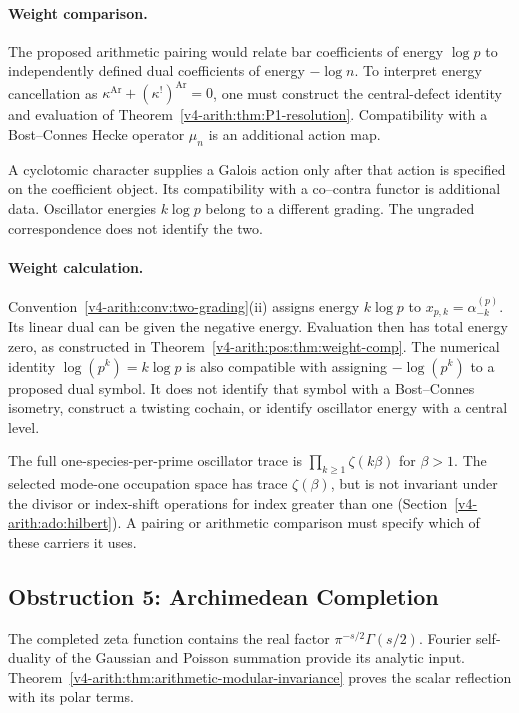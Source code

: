 \paragraph{Weight comparison.} The proposed arithmetic pairing
would relate bar coefficients of energy \(\log p\) to independently
defined dual coefficients of energy \(-\log n\).
To interpret energy cancellation as
\(\kappa^{\mathrm{Ar}}+(\kappa^!)^{\mathrm{Ar}}=0\), one must
construct the central-defect identity and evaluation of
Theorem~\ref{v4-arith:thm:P1-resolution}. Compatibility with a
Bost--Connes Hecke operator \(\mu_n\) is an additional action map.

A cyclotomic character supplies a Galois action only after that
action is specified on the coefficient object.
Its compatibility with a co--contra functor is additional data.
Oscillator energies \(k\log p\) belong to a different grading.
The ungraded correspondence does not identify the two.

\paragraph{Weight calculation.}
Convention~\ref{v4-arith:conv:two-grading}(ii) assigns energy
\(k\log p\) to \(x_{p,k}=\alpha^{(p)}_{-k}\). Its linear dual can be
given the negative energy. Evaluation then has total energy zero,
as constructed in Theorem~\ref{v4-arith:pos:thm:weight-comp}.
The numerical identity \(\log(p^k)=k\log p\) is also compatible with
assigning \(-\log(p^k)\) to a proposed dual symbol. It does not identify
that symbol with a Bost--Connes isometry, construct a twisting cochain,
or identify oscillator energy with a central level.

The full one-species-per-prime oscillator trace is
\(\prod_{k\ge1}\zeta(k\beta)\) for \(\beta>1\). The selected mode-one
occupation space has trace \(\zeta(\beta)\), but is not invariant under
the divisor or index-shift operations for index greater than one
(Section~\ref{v4-arith:ado:hilbert}). A pairing or arithmetic comparison must
specify which of these carriers it uses.

\subsection{Obstruction 5: Archimedean Completion}
\label{v4-arith:pos:att-5-archimedean}

The completed zeta function contains the real factor
\(\pi^{-s/2}\Gamma(s/2)\). Fourier self-duality of the Gaussian
and Poisson summation provide its analytic input.
Theorem~\ref{v4-arith:thm:arithmetic-modular-invariance}
proves the scalar reflection with its polar terms.

